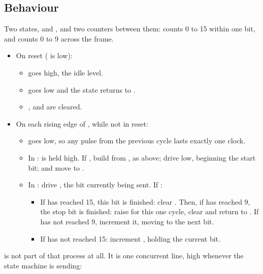 \subsection{Behaviour}
\label{c2:sec:uart_tx_behaviour}
Two states,  and , and two counters between them: 
counts 0 to 15 within one bit, and  counts 0 to 9 across the frame.
\begin{itemize}
  \item On reset ( is low):
  \begin{itemize}
    \item {} goes high, the idle level.
    \item {} goes low and the state returns to .
    \item {},  and  are cleared.
  \end{itemize}
  \item On each rising edge of , while not in reset:
  \begin{itemize}
    \item {} goes low, so any pulse from the previous cycle lasts exactly one clock.
    \item In \textbf{}:  is held high. If , build
       from , as above; drive  low, beginning the start bit; and
      move to .
    \item In \textbf{}: drive , the bit currently being
      sent. If :
    \begin{itemize}
      \item If  has reached 15, this bit is finished: clear . Then, if
         has reached 9, the stop bit is finished: raise  for this one
        cycle, clear  and return to . If  has not
        reached 9, increment it, moving to the next bit.
      \item If  has not reached 15: increment , holding the current bit.
    \end{itemize}
  \end{itemize}
\end{itemize}

 is not part of that process at all. It is one concurrent line, high whenever the state
machine is sending:

